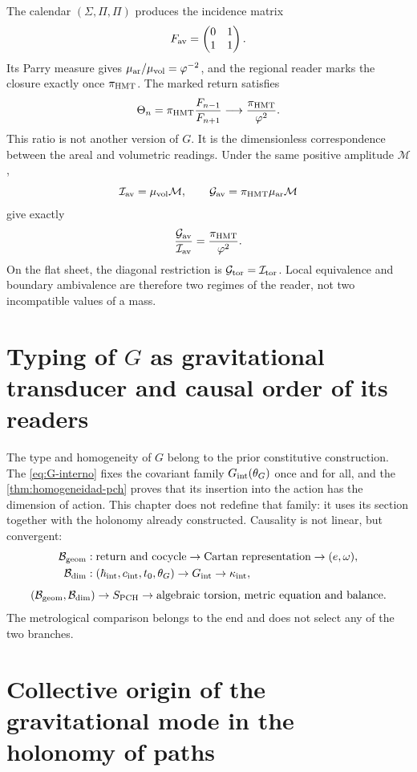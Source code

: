 The calendar \((\Sigma,\Pi,\Pi)\) produces the incidence matrix
\[
 F_{\rm av}=\begin{pmatrix}0&1\\1&1\end{pmatrix}.
\]
Its Parry measure gives
\(\mu_{\rm ar}/\mu_{\rm vol}=\varphi^{-2}\), and the regional reader marks the
closure exactly once \(\pi_{\rm HMT}\).  The marked return satisfies
\[
 \Theta_n
 =\pi_{\rm HMT}\frac{F_{n-1}}{F_{n+1}}
 \longrightarrow
 \frac{\pi_{\rm HMT}}{\varphi^2}.
\]
This ratio is not another version of \(G\). It is the dimensionless correspondence between
the areal and volumetric readings. Under the same positive amplitude
\(\mathcal M\),
\[
 \mathcal I_{\rm av}=\mu_{\rm vol}\mathcal M,\qquad
 \mathcal G_{\rm av}=\pi_{\rm HMT}\mu_{\rm ar}\mathcal M
\]
give exactly
\[
 \frac{\mathcal G_{\rm av}}{\mathcal I_{\rm av}}
 =\frac{\pi_{\rm HMT}}{\varphi^2}.
\]
On the flat sheet, the diagonal restriction is
\(\mathcal G_{\rm tor}=\mathcal I_{\rm tor}\).  Local equivalence and
boundary ambivalence are therefore two regimes of the reader, not two
incompatible values of a mass.

\section{Typing of \(G\) as gravitational transducer and causal order of its readers}

The type and homogeneity of \(G\) belong to the prior constitutive
construction. The \cref{eq:G-interno} fixes the covariant family
\(G_{\rm int}(\theta_G)\) once and for all, and the
\cref{thm:homogeneidad-pch} proves that its insertion into the action has
the dimension of action. This chapter does not redefine that family: it uses its
section together with the holonomy already constructed. Causality is not linear,
but convergent:
\[
\begin{aligned}
 \mathcal B_{\rm geom}&:
 \text{return and cocycle}\to\text{Cartan representation}
 \to(e,\omega),\\
 \mathcal B_{\rm dim}&:
 (\hbar_{\rm int},c_{\rm int},t_0,\theta_G)
 \to G_{\rm int}\to\kappa_{\rm int},
\end{aligned}
\]
\[
 (\mathcal B_{\rm geom},\mathcal B_{\rm dim})
 \to S_{\rm PCH}
 \to\text{algebraic torsion, metric equation and balance}.
\]
The metrological comparison belongs to the end and does not select any of
the two branches.

\section{Collective origin of the gravitational mode in the holonomy of paths}

